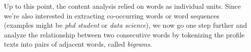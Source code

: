 \documentclass[]{article}
\newenvironment{Shaded}{\begin{snugshade}}{\end{snugshade}}
\newcommand{\KeywordTok}[1]{\textcolor[rgb]{0.13,0.29,0.53}{\textbf{#1}}}
\newcommand{\DataTypeTok}[1]{\textcolor[rgb]{0.13,0.29,0.53}{#1}}
\newcommand{\DecValTok}[1]{\textcolor[rgb]{0.00,0.00,0.81}{#1}}
\newcommand{\CharTok}[1]{\textcolor[rgb]{0.31,0.60,0.02}{#1}}
\newcommand{\StringTok}[1]{\textcolor[rgb]{0.31,0.60,0.02}{#1}}
\newcommand{\CommentTok}[1]{\textcolor[rgb]{0.56,0.35,0.01}{\textit{#1}}}
\newcommand{\OtherTok}[1]{\textcolor[rgb]{0.56,0.35,0.01}{#1}}
\newcommand{\OperatorTok}[1]{\textcolor[rgb]{0.81,0.36,0.00}{\textbf{#1}}}
\newcommand{\NormalTok}[1]{#1}
\begin{document}
Up to this point, the content analysis relied on words as individual
units. Since we're also interested in extracting co-occurring words or
word sequences (examples might be \emph{phd student} or \emph{data
science}), we now go one step further and analyze the relationship
between two consecutive words by tokenizing the profile texts into pairs
of adjacent words, called \emph{bigrams}.

\begin{Shaded}
\end{Shaded}
\end{document}
